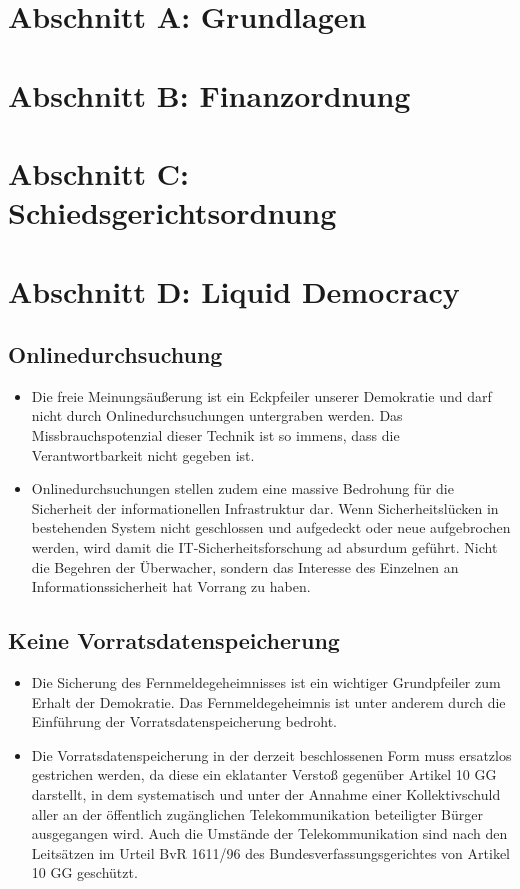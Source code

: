 \documentclass[10pt,a4paper,twocolumn,twoside,titlepage]{article}
\begin{document}
\section{Abschnitt A: Grundlagen}
\section{Abschnitt B: Finanzordnung}
\section{Abschnitt C: Schiedsgerichtsordnung}
\section{Abschnitt D: Liquid Democracy}

\subsection{Onlinedurchsuchung}

\begin{itemize}
\item Die freie Meinungsäußerung ist ein Eckpfeiler unserer Demokratie und darf nicht durch Onlinedurchsuchungen untergraben werden. Das Missbrauchspotenzial dieser Technik ist so immens, dass die Verantwortbarkeit nicht gegeben ist.
\item Onlinedurchsuchungen stellen zudem eine massive Bedrohung für die Sicherheit der informationellen Infrastruktur dar. Wenn Sicherheitslücken in bestehenden System nicht geschlossen und aufgedeckt oder neue aufgebrochen werden, wird damit die IT-Sicherheitsforschung ad absurdum geführt. Nicht die Begehren der Überwacher, sondern das Interesse des Einzelnen an Informationssicherheit hat Vorrang zu haben.
\end{itemize}

\subsection{Keine Vorratsdatenspeicherung}
\begin{itemize}
\item Die Sicherung des Fernmeldegeheimnisses ist ein wichtiger Grundpfeiler zum Erhalt der Demokratie. Das Fernmeldegeheimnis ist unter anderem durch die Einführung der Vorratsdatenspeicherung bedroht.
\item Die Vorratsdatenspeicherung in der derzeit beschlossenen Form muss ersatzlos gestrichen werden, da diese ein eklatanter Verstoß gegenüber Artikel 10 GG darstellt, in dem systematisch und unter der Annahme einer Kollektivschuld aller an der öffentlich zugänglichen Telekommunikation beteiligter Bürger ausgegangen wird. Auch die Umstände der Telekommunikation sind nach den Leitsätzen im Urteil BvR 1611/96 des Bundesverfassungsgerichtes von Artikel 10 GG geschützt.
\end{itemize}
\end{document}
